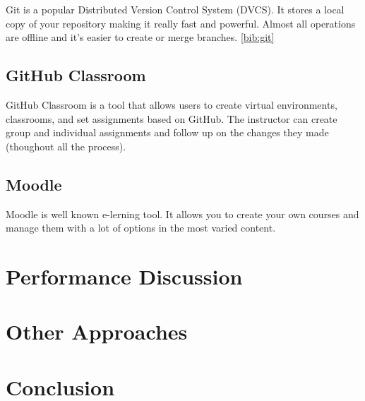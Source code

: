 \documentclass[12pt]{article}
\begin{document}
Git is a popular Distributed Version Control System (DVCS). It stores a local copy of your repository making it really fast and powerful. Almost all operations are offline and it's easier to create or merge branches. \ref{bib:git}

\subsection{GitHub Classroom}

GitHub Classroom is a tool that allows users to create virtual environments, classrooms, and set assignments based on GitHub. The instructor can create group and individual assignments and follow up on the changes they made (thoughout all the process).

\subsection{Moodle}

Moodle is well known e-lerning tool. It allows you to create your own courses and manage them with a lot of options in the most varied content. 

\section{Performance Discussion}

\section{Other Approaches}

\section{Conclusion}
\end{document}
